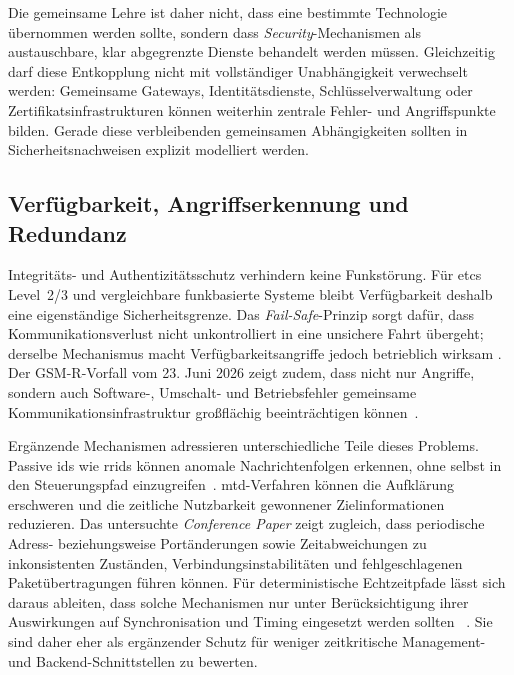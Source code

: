 \documentclass[runningheads]{res/llncs}
\begin{document}
Die gemeinsame Lehre ist daher nicht, dass eine bestimmte Technologie übernommen werden sollte, sondern dass \textit{Security}-Mechanismen als austauschbare, klar abgegrenzte Dienste behandelt werden müssen. Gleichzeitig darf diese Entkopplung nicht mit vollständiger Unabhängigkeit verwechselt werden: Gemeinsame Gateways, Identitätsdienste, Schlüsselverwaltung oder Zertifikatsinfrastrukturen können weiterhin zentrale Fehler- und Angriffspunkte bilden. Gerade diese verbleibenden gemeinsamen Abhängigkeiten sollten in Sicherheitsnachweisen explizit modelliert werden.

\subsection{Verfügbarkeit, Angriffserkennung und Redundanz}
\label{sec:IDS_MTD_und_Redundanzkonzepte}
Integritäts- und Authentizitätsschutz verhindern keine Funkstörung. Für \gls{etcs} Level~2/3 und vergleichbare funkbasierte Systeme bleibt Verfügbarkeit deshalb eine eigenständige Sicherheitsgrenze. Das \textit{Fail-Safe}-Prinzip sorgt dafür, dass Kommunikationsverlust nicht unkontrolliert in eine unsichere Fahrt übergeht; derselbe Mechanismus macht Verfügbarkeitsangriffe jedoch betrieblich wirksam \parencite[S. 56--59]{gaggeroSurvey2024}. Der GSM-R-Vorfall vom 23. Juni 2026 zeigt zudem, dass nicht nur Angriffe, sondern auch Software-, Umschalt- und Betriebsfehler gemeinsame Kommunikationsinfrastruktur großflächig beeinträchtigen können~\cite{dbinfragoUrsacheZugfunkStoerung2026}.

Ergänzende Mechanismen adressieren unterschiedliche Teile dieses Problems. Passive \gls{ids} wie \gls{rrids} können anomale Nachrichtenfolgen erkennen, ohne selbst in den Steuerungspfad einzugreifen~\cite{melaragnoRail2016}. \gls{mtd}-Verfahren können die Aufklärung erschweren und die zeitliche Nutzbarkeit gewonnener Zielinformationen reduzieren. Das untersuchte \textit{Conference Paper} zeigt zugleich, dass periodische Adress- beziehungsweise Portänderungen sowie Zeitabweichungen zu inkonsistenten Zuständen, Verbindungsinstabilitäten und fehlgeschlagenen Paketübertragungen führen können. Für deterministische Echtzeitpfade lässt sich daraus ableiten, dass solche Mechanismen nur unter Berücksichtigung ihrer Auswirkungen auf Synchronisation und Timing eingesetzt werden sollten
~\parencite[S. 32-38]{poschingerOpenMTD2020}. Sie sind daher eher als ergänzender Schutz für weniger zeitkritische Management- und Backend-Schnittstellen zu bewerten.
\end{document}
